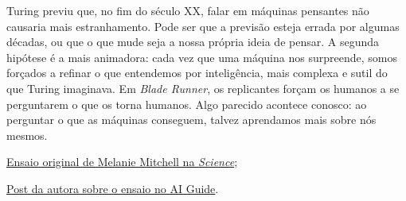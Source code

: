 {\subtitle{O Que o Futuro Nos Reserva?}

\hspace*{1.5em}Turing previu que, no fim do século XX, falar em máquinas pensantes não causaria mais estranhamento. Pode ser que a previsão esteja errada por algumas décadas, ou que o que mude seja a nossa própria ideia de pensar. A segunda hipótese é a mais animadora: cada vez que uma máquina nos surpreende, somos forçados a refinar o que entendemos por inteligência, mais complexa e sutil do que Turing imaginava. Em \textit{Blade Runner}, os replicantes forçam os humanos a se perguntarem o que os torna humanos. Algo parecido acontece conosco: ao perguntar o que as máquinas conseguem, talvez aprendamos mais sobre nós mesmos.

}


\begin{hypeitemize}
\item \href{https://www.science.org/doi/10.1126/science.adq9356}{Ensaio original de Melanie Mitchell na \textit{Science}};
\item \href{https://aiguide.substack.com/p/the-turing-test-and-our-shifting}{Post da autora sobre o ensaio no AI Guide}.
\end{hypeitemize}

